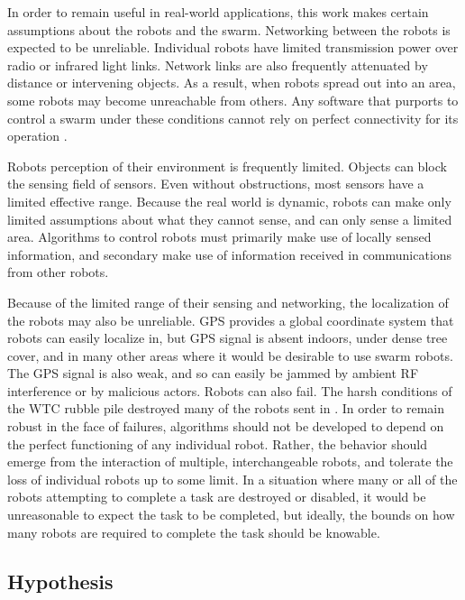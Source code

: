 \documentclass[]{article}
\begin{document}
In order to remain useful in real-world applications, this work makes certain assumptions about the robots and the swarm. 
Networking between the robots is expected to be unreliable. 
Individual robots have limited transmission power over radio or infrared light links. 
Network links are also frequently attenuated by distance or intervening objects. 
As a result, when robots spread out into an area, some robots may become unreachable from others. 
Any software that purports to control a swarm under these conditions cannot rely on perfect connectivity for its operation . 

Robots perception of their environment is frequently limited. 
Objects can block the sensing field of sensors.
Even without obstructions, most sensors have a limited effective range. 
Because the real world is dynamic, robots can make only limited assumptions about what they cannot sense, and can only sense a limited area. 
Algorithms to control robots must primarily make use of locally sensed information, and secondary make use of information received in communications from other robots. 

Because of the limited range of their sensing and networking, the localization of the robots may also be unreliable. 
GPS provides a global coordinate system that robots can easily localize in, but GPS signal is absent indoors, under dense tree cover, and in many other areas where it would be desirable to use swarm robots. 
The GPS signal is also weak, and so can easily be jammed by ambient RF interference or by malicious actors. 
Robots can also fail. 
The harsh conditions of the WTC rubble pile destroyed many of the robots sent in \cite{Micire02analysisof}.
In order to remain robust in the face of failures, algorithms should not be developed to depend on the perfect functioning of any individual robot. 
Rather, the behavior should emerge from the interaction of multiple, interchangeable robots, and tolerate the loss of individual robots up to some limit. 
In a situation where many or all of the robots attempting to complete a task are destroyed or disabled, it would be unreasonable to expect the task to be completed, but ideally, the bounds on how many robots are required to complete the task should be knowable. 

\subsection{Hypothesis}
\end{document}
